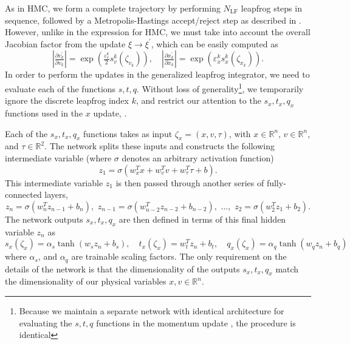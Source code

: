 \documentclass{article} %
\begin{document}
As in HMC, we form a complete trajectory by performing \(N_{\mathrm{LF}}\) leapfrog steps in sequence, followed by a
Metropolis-Hastings accept/reject step as described in .
%
However, unlike in the expression for HMC, we must take into account the overall Jacobian factor from the update
\(\xi\rightarrow\xi^{\prime}\), which can be easily computed as 
%
\begin{equation}
   \left|\tfrac{\partial v^{\prime}_{k}}{\partial v_{k}}\right| 
   = \exp{\left(\tfrac{\varepsilon^{k}_{v}}{2}s^{k}_{v}(\zeta_{v_{k}})\right)},\quad
   \left|\tfrac{\partial x^{\prime}_{k}}{\partial x_{k}}\right| 
   = \exp{\left(\varepsilon^{k}_{x} s^{k}_{x}(\zeta_{x_{k}})\right)}.
\end{equation}
%
In order to perform the updates in the generalized leapfrog integrator, we need to evaluate each of the functions
\(s, t, q\).
%
%
Without loss of generality\footnote{Because we maintain a separate network with identical architecture for evaluating
the \(s, t, q\) functions in the momentum update , the procedure is identical},
we temporarily ignore the discrete leapfrog index \(k\), and restrict our attention to the
\(s_{x}, t_{x}, q_{x}\) functions used in the \(x\) update, .
%

Each of the \(s_{x}, t_{x}, q_{x}\) functions takes as input \(\zeta_{x} = (x, v, \tau)\), with \(x\in\mathbb{R}^{n}\),
\(v\in\mathbb{R}^{n}\), and \(\tau \in \mathbb{R}^{2}\).
%
The network splits these inputs and constructs the following intermediate variable (where \(\sigma\) denotes an
arbitrary activation function)
%
\begin{equation}
   z_{1} = \sigma(w_{x}^{T}x + w_{v}^{T}v + w_{\tau}^{T}\tau + b).
\end{equation}
%
This intermediate variable \(z_{1}\) is then passed through another series of fully-connected layers,
%
\begin{equation}
   z_{n} = \sigma(w_{n}^{T} z_{n-1} + b_{n}),\,\, z_{n-1}=\sigma(w_{n-2}^{T}z_{n-2} + b_{n-2}),\,\,%
   \ldots,\,\, z_{2} = \sigma(w_{2}^{T} z_{1} + b_{2}).
\end{equation}
%
The network outputs \(s_{x}, t_{x}, q_{x}\) are then defined in terms of this final hidden variable \(z_{n}\) as
%
\begin{equation}
   s_{x}(\zeta_{x}) = \alpha_{s}\tanh(w_{s}z_{n} + b_{s}),\quad
   t_{x}(\zeta_{x}) = w_{t}^{T}z_{n} + b_{t},\quad
   q_{x}(\zeta_{x}) = \alpha_{q}\tanh(w_{q}z_{n} + b_{q})
\end{equation}
%
where \(\alpha_{s}\), and \(\alpha_{q}\) are trainable scaling factors.
%
The only requirement on the details of the network is that the dimensionality of the outputs \(s_{x}, t_{x}, q_{x}\)
match the dimensionality of our physical variables \(x, v \in\mathbb{R}^{n}\).
%
\end{document}
